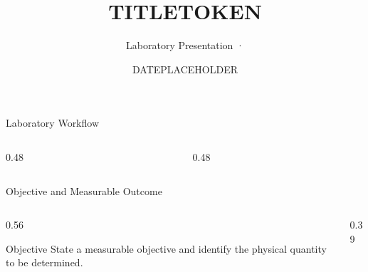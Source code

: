 \title[TITLETOKEN]{TITLETOKEN}
\subtitle{Laboratory Presentation · \labversionlabel}
\author{}
\date{DATEPLACEHOLDER}



\begin{frame}[plain]
  \titlepage
\end{frame}

\begin{frame}{Laboratory Workflow}
  \vspace{0.7em}
  \begin{columns}[T,onlytextwidth]
    \begin{column}{0.48\textwidth}
      \vspace{0.6em}
    \end{column}
    \begin{column}{0.48\textwidth}
      \vspace{0.6em}
    \end{column}
  \end{columns}
\end{frame}

\begin{frame}{Objective and Measurable Outcome}
  \begin{columns}[T,onlytextwidth]
    \begin{column}{0.56\textwidth}
      \begin{block}{Objective}
        State a measurable objective and identify the physical quantity to
        be determined.
      \end{block}
    \end{column}
    \begin{column}{0.39\textwidth}
    \end{column}
  \end{columns}
\end{frame}

